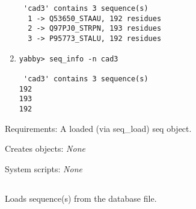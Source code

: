 \begin{description}
\begin{enumerate}
\begin{verbatim}
 'cad3' contains 3 sequence(s)
  1 -> Q53650_STAAU, 192 residues
  2 -> Q97PJ0_STRPN, 193 residues
  3 -> P95773_STALU, 192 residues

\end{verbatim}

\item
\begin{verbatim}
yabby> seq_info -n cad3

 'cad3' contains 3 sequence(s)
192
193
192

\end{verbatim}

\end{enumerate}


\item{Requirements:} A loaded (via seq\_load) seq object.


\item{Creates objects:} {\em None}


\item{System scripts:} {\em None}

\end{description}



\subsection[seq\_load]{  }



Loads sequence(s) from the database file.


